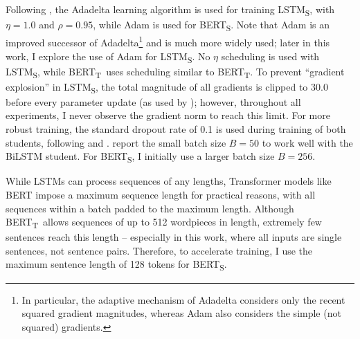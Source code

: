 \documentclass[bsc,frontabs,twoside,singlespacing,parskip,deptreport]{infthesis}
\def\BERTT{BERT\textsubscript{T}}
\def\BERTS{BERT\textsubscript{S}}
\def\LSTMS{LSTM\textsubscript{S}}
\begin{document}
{{{      %
      Following \citeauthor{Tang_2019b}, the Adadelta learning algorithm \citep{Zeiler_2012} is used for training \LSTMS, with $\eta=1.0$ and $\rho=0.95$, while Adam is used for \BERTS.
      Note that Adam is an improved successor of Adadelta\footnote{In particular, the adaptive mechanism of Adadelta considers only the recent squared gradient magnitudes, whereas Adam also considers the simple (not squared) gradients.} and is much more widely used; later in this work, I explore the use of Adam for \LSTMS. No $\eta$ scheduling is used with \LSTMS, while \BERTT~uses scheduling similar to \BERTT.
      To prevent ``gradient explosion'' in \LSTMS, the total magnitude of all gradients is clipped to 30.0 before every parameter update (as used by \citeauthor{Tang_2019b}); however, throughout all experiments, I never observe the gradient norm to reach this limit.
      For more robust training, the standard dropout rate of 0.1 is used during training of both students, following \citet{Devlin_2018} and \citeauthor{Tang_2019b}.
      \citeauthor{Tang_2019b} report the small batch size $B=50$ to work well with the BiLSTM student. For \BERTS, I initially use a larger batch size $B=256$.

      While LSTMs can process sequences of any lengths, Transformer models like BERT impose a maximum sequence length for practical reasons, with all sequences within a batch padded to the maximum length. Although \BERTT~allows sequences of up to 512 wordpieces in length, extremely few sentences reach this length -- especially in this work, where all inputs are single sentences, not sentence pairs. Therefore, to accelerate training, I use the maximum sentence length of 128 tokens for \BERTS.

}}}
\end{document}
